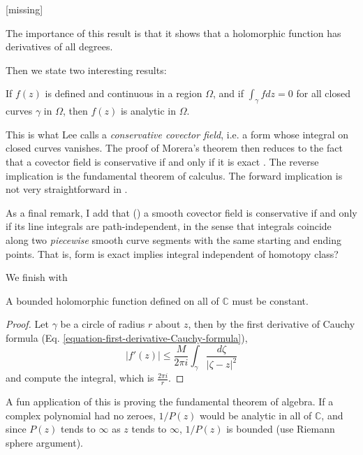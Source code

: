 \begin{lemma}
\label{lemma-technical-lemma}
[missing]
\end{lemma}

\noindent
The importance of this result is that it shows that a holomorphic function has
derivatives of all degrees.

Then we state two interesting results:

\begin{theorem}[Morera]
\label{theorem-Morera}
\begin{reference}
\cite[p. 122]{ahl}
\end{reference}
If $f(z)$ is defined and continuous in a region $\Omega$, and if 
$\int_\gamma fdz=0$ for all closed curves $\gamma$ in $\Omega$, then $f(z)$ is
analytic in $\Omega$.
\end{theorem}

\noindent
This is what Lee calls a {\it conservative covector field}, i.e. a form whose
integral on closed curves vanishes. The proof of Morera's theorem then reduces
to the fact that a covector field is conservative if and only if it is exact
\cite[Theorem 11.42]{les}. The reverse implication is the fundamental theorem of
calculus. The forward implication is not very straightforward in \cite{les}.

As a final remark, I add that (\cite[Propoistion 11.40]{les}) a smooth covector
field is conservative if and only if its line integrals are path-independent, in
the sense that integrals coincide along two {\it piecewise} smooth curve
segments with the same starting and ending points. That is, form is exact
implies integral independent of homotopy class?

We finish with

\begin{theorem}[Liouville]
\label{theorem-Liouville}
A bounded holomorphic function defined on all of $\mathbb{C}$ must be constant.
\end{theorem}

\begin{proof}
Let $\gamma$ be a circle of radius $r$ about $z$, then by the first derivative
of Cauchy formula (Eq. \ref{equation-first-derivative-Cauchy-formula}),
$$
|f'(z)|\leq \frac{M}{2\pi i}\int_\gamma \frac{d\zeta}{|\zeta-z|^2}
$$
and compute the integral, which is $\frac{2\pi i}{r}$.
\end{proof}

\noindent
A fun application of this is proving the fundamental theorem of algebra. If a
complex polynomial had no zeroes, $1/P(z)$ would be analytic in all of
$\mathbb{C}$, and since $P(z)$ tends to $\infty$ as $z$ tends to $\infty$,
$1/P(z)$ is bounded (use Riemann sphere argument).

